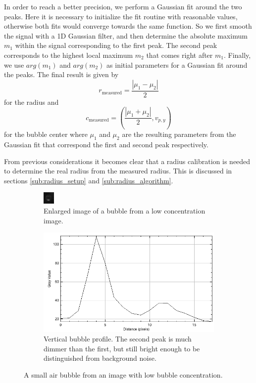 	In order to reach a better precision, we perform a Gaussian fit around the two peaks. Here it is necessary to initialize the fit routine with reasonable values, otherwise both fits would converge towards the same function. So we first smooth the signal with a 1D Gaussian filter, and then determine the absolute maximum $m_1$ within the signal corresponding to the first peak. The second peak corresponds to the highest local maximum $m_2$ that comes right after $m_1$. Finally, we use $arg(m_1)$ and $arg(m_2)$ as initial parameters for a Gaussian fit around the peaks. The final result is given by
	\begin{equation}
		r_{\text{measured}} = \dfrac{| \mu_1 - \mu_2 |}{2}
		\label{eq:get_radius}
	\end{equation}
	for the radius and 
	\begin{equation}
		c_{\text{measured}} =
						 \left( 
							\dfrac{| \mu_1 + \mu_2 |}{2} ,
							 v_{p,y}
						 \right)
	\end{equation}
	for the bubble center 
	where $\mu_1$ and $\mu_2$ are the resulting parameters from the Gaussian fit that correspond the first and second peak respectively. 
	
	From previous considerations it becomes clear that a radius calibration is needed to determine the real radius from the measured radius. This is discussed in sections \ref{sub:radius_setup} and \ref{sub:radius_algorithm}.

		
		\begin{figure}
			\begin{subfigure}[t]{.4\textwidth}
				\includegraphics[scale=9]{images/one_peaks.png}
				\caption{Enlarged image of a bubble from a low concentration image. }
			\end{subfigure}
			
			\begin{subfigure}[t]{.5\textwidth}
				\includegraphics[scale=.5]{graphs/one_peaks_profile.png}
				\caption{Vertical bubble profile. The second peak is much dimmer than the first, but still bright enough to be distinguished from background noise.}
			\end{subfigure}
			\caption{A small air bubble from an image with low bubble concentration. }
			\label{fig:bubble_profile}
		\end{figure}
		
